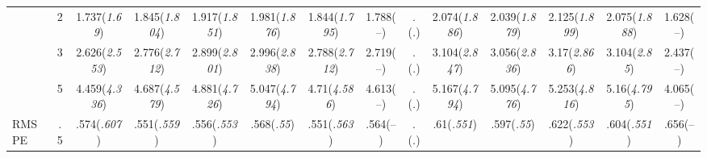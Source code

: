 \documentclass{article}
\begin{document}
\begin{table}[tbp]
{\begin{tabularx}{\textwidth}{lCCCCCCCCCCCCC}
&2&1.737\newline (\emph{1.69})&1.845\newline (\emph{1.804})&1.917\newline (\emph{1.851})&1.981\newline (\emph{1.876})&1.844\newline (\emph{1.795})&1.788\newline (--)&.\newline (\emph{.})&2.074\newline (\emph{1.886})&2.039\newline (\emph{1.879})&2.125\newline (\emph{1.899})&2.075\newline (\emph{1.888})&1.628\newline (--) \tabularnewline
&3&2.626\newline (\emph{2.553})&2.776\newline (\emph{2.712})&2.899\newline (\emph{2.801})&2.996\newline (\emph{2.838})&2.788\newline (\emph{2.712})&2.719\newline (--)&.\newline (\emph{.})&3.104\newline (\emph{2.847})&3.056\newline (\emph{2.836})&3.17\newline (\emph{2.866})&3.104\newline (\emph{2.85})&2.437\newline (--) \tabularnewline
&5&4.459\newline (\emph{4.336})&4.687\newline (\emph{4.579})&4.881\newline (\emph{4.726})&5.047\newline (\emph{4.794})&4.71\newline (\emph{4.586})&4.613\newline (--)&.\newline (\emph{.})&5.167\newline (\emph{4.794})&5.095\newline (\emph{4.776})&5.253\newline (\emph{4.816})&5.16\newline (\emph{4.795})&4.065\newline (--) \tabularnewline
\midrule RMSPE&.5&.574\newline (\emph{.607})&.551\newline (\emph{.559})&.556\newline (\emph{.553})&.568\newline (\emph{.55})&.551\newline (\emph{.563})&.564\newline (--)&.\newline (\emph{.})&.61\newline (\emph{.551})&.597\newline (\emph{.55})&.622\newline (\emph{.553})&.604\newline (\emph{.551})&.656\newline (--) \tabularnewline

\end{tabularx}}
\end{table}
\end{document}
